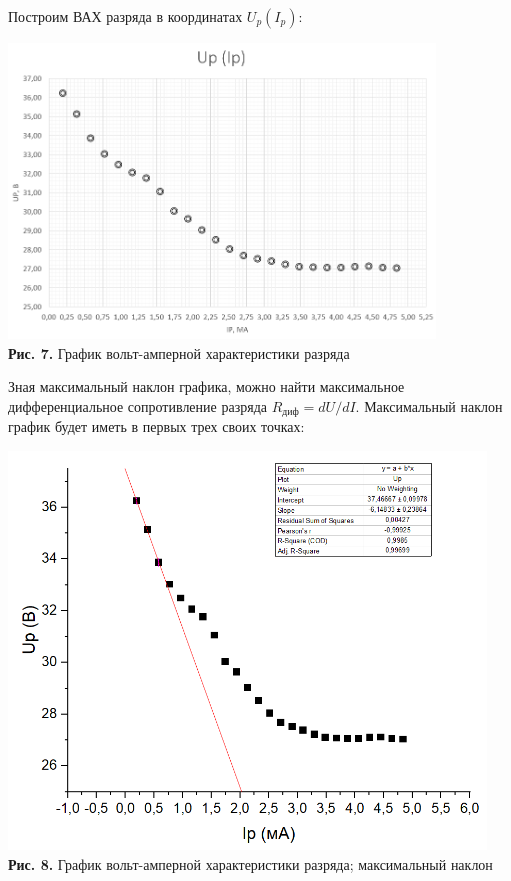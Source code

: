\documentclass[a4paper,12pt]{article} %
\begin{document}
\hfill \break Построим ВАХ разряда в координатах $U_{p}(I_{p})$:

\begin{center}
\includegraphics[width=0.85\textwidth]{3.5.1_7.png}\\
\textbf{Рис. 7.} График вольт-амперной характеристики разряда \\
\end{center}

\hfill \break Зная максимальный наклон графика, можно найти максимальное дифференциальное сопротивление разряда $R_\text{диф} = dU/dI$. Максимальный наклон график будет иметь в первых трех своих точках:

\begin{center}
\includegraphics[width=0.95\textwidth]{3.5.1_8.png}\\
\textbf{Рис. 8.} График вольт-амперной характеристики разряда; максимальный наклон \\
\end{center}
\end{document}
